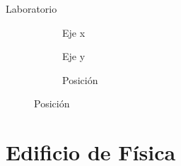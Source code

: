 \documentclass{beamer}
\begin{document}
  \begin{frame}{Laboratorio}
    \begin{figure}[H]
      \centering
        \begin{subfigure}[b]{.3\textwidth}
          \centering
          \hspace*{-0.8cm}
           
          \vspace*{-0.5cm}
          \caption{Eje x}
          \label{fig:boxplot_lab_x}
        \end{subfigure}
        \hspace*{0.1cm}
        \begin{subfigure}[b]{.3\textwidth}
          \centering
            
          \vspace*{-0.5cm}
          \caption{Eje y}
          \label{fig:boxplot_lab_y}
        \end{subfigure}
        \hspace*{0.1cm}
        \begin{subfigure}[b]{.3\textwidth}
            \centering
              
            \caption{Posición}
            \label{fig:boxplot_lab_pos}
          \end{subfigure}
        \label{fig:boxplot_lab}
    \end{figure}
  \end{frame}
  

  \section{Edificio de Física}
\end{document}
